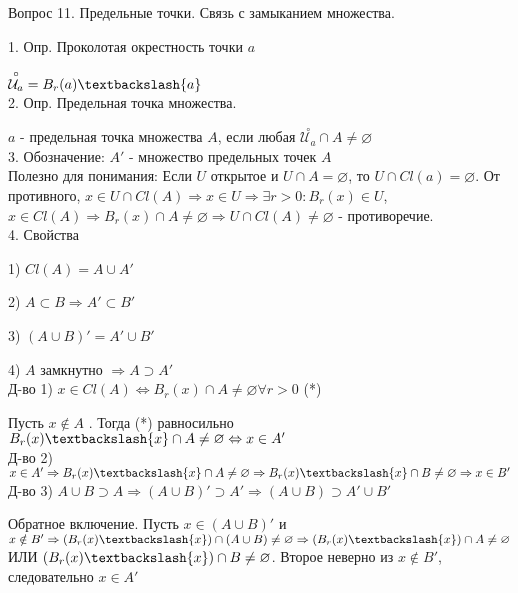\documentclass[12pt]{article}
\begin{document}
\begin{center}
Вопрос 11. Предельные точки. Связь с замыканием множества.
\end{center}

1. Опр. Проколотая окрестность точки $a$ 

$\overset{\circ}{\mathcal{U}_a} = B_r(a)\textbackslash \{a\}$\\

2. Опр. Предельная точка множества.

$a$ - предельная точка множества $A$, если любая $\overset{\circ}{\mathcal{U}_a}\cap A \neq \varnothing$\\

3. Обозначение: $A'$ - множество предельных точек $A$\\

Полезно для понимания: Если $U$ открытое и $U \cap A = \varnothing$, то $U\cap Cl(a) = \varnothing$. От противного, $x \in U \cap Cl(A) \Rightarrow x \in U \Rightarrow \exists r>0 : B_r(x)\in U$, $x \in Cl(A) \Rightarrow B_r(x)\cap A \neq \varnothing \Rightarrow U\cap Cl(A) \neq \varnothing$ - противоречие.\\

4. Свойства

1) $Cl(A) = A\cup A'$

2) $A \subset B \Rightarrow A' \subset B'$

3) $(A\cup B)' = A' \cup B'$

4) $A$ замкнутно $\Rightarrow A\supset A'$\\

Д-во 1) $x \in Cl(A) \Leftrightarrow B_r(x)\cap A \neq \varnothing \forall r>0$ (*)

Пусть $x \notin A$ . Тогда (*) равносильно $B_r(x)\textbackslash \{x\} \cap A \neq \varnothing \Leftrightarrow x\in A'$\\

Д-во 2) $x \in A' \Rightarrow B_r(x)\textbackslash \{x\} \cap A  \neq \varnothing \Rightarrow B_r(x)\textbackslash \{x\} \cap B \neq \varnothing \Rightarrow x \in B'$\\

Д-во 3) $A \cup B \supset A \Rightarrow (A\cup B)' \supset A' \Rightarrow (A\cup B) \supset A'\cup B'$

Обратное включение. Пусть $x\in (A\cup B)'$ и $x \notin B' \Rightarrow (B_r(x)\textbackslash \{x\})\cap (A\cup B) \neq \varnothing \Rightarrow (B_r(x)\textbackslash \{x\})\cap A \neq \varnothing$ ИЛИ $(B_r(x)\textbackslash \{x\})\cap B \neq \varnothing$. Второе неверно из $x\notin B'$, следовательно $x \in A'$\\
\end{document}
